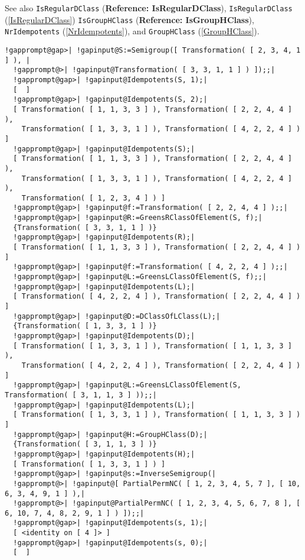 \documentclass[a4paper,11pt]{report}
\begin{document}
{{{ See also \texttt{IsRegularDClass} (\textbf{Reference: IsRegularDClass}), \texttt{IsRegularDClass} (\ref{IsRegularDClass}) \texttt{IsGroupHClass} (\textbf{Reference: IsGroupHClass}), \texttt{NrIdempotents} (\ref{NrIdempotents}), and \texttt{GroupHClass} (\ref{GroupHClass}). 
\begin{Verbatim}[commandchars=!@|,fontsize=\small,frame=single,label=Example]
  !gapprompt@gap>| !gapinput@S:=Semigroup([ Transformation( [ 2, 3, 4, 1 ] ), |
  !gapprompt@>| !gapinput@Transformation( [ 3, 3, 1, 1 ] ) ]);;|
  !gapprompt@gap>| !gapinput@Idempotents(S, 1);|
  [  ]
  !gapprompt@gap>| !gapinput@Idempotents(S, 2);|
  [ Transformation( [ 1, 1, 3, 3 ] ), Transformation( [ 2, 2, 4, 4 ] ), 
    Transformation( [ 1, 3, 3, 1 ] ), Transformation( [ 4, 2, 2, 4 ] ) ]
  !gapprompt@gap>| !gapinput@Idempotents(S);|
  [ Transformation( [ 1, 1, 3, 3 ] ), Transformation( [ 2, 2, 4, 4 ] ), 
    Transformation( [ 1, 3, 3, 1 ] ), Transformation( [ 4, 2, 2, 4 ] ), 
    Transformation( [ 1, 2, 3, 4 ] ) ]
  !gapprompt@gap>| !gapinput@f:=Transformation( [ 2, 2, 4, 4 ] );;|
  !gapprompt@gap>| !gapinput@R:=GreensRClassOfElement(S, f);|
  {Transformation( [ 3, 3, 1, 1 ] )}
  !gapprompt@gap>| !gapinput@Idempotents(R);|
  [ Transformation( [ 1, 1, 3, 3 ] ), Transformation( [ 2, 2, 4, 4 ] ) ]
  !gapprompt@gap>| !gapinput@f:=Transformation( [ 4, 2, 2, 4 ] );;|
  !gapprompt@gap>| !gapinput@L:=GreensLClassOfElement(S, f);;|
  !gapprompt@gap>| !gapinput@Idempotents(L);|
  [ Transformation( [ 4, 2, 2, 4 ] ), Transformation( [ 2, 2, 4, 4 ] ) ]
  !gapprompt@gap>| !gapinput@D:=DClassOfLClass(L);|
  {Transformation( [ 1, 3, 3, 1 ] )}
  !gapprompt@gap>| !gapinput@Idempotents(D);|
  [ Transformation( [ 1, 3, 3, 1 ] ), Transformation( [ 1, 1, 3, 3 ] ), 
    Transformation( [ 4, 2, 2, 4 ] ), Transformation( [ 2, 2, 4, 4 ] ) ]
  !gapprompt@gap>| !gapinput@L:=GreensLClassOfElement(S, Transformation( [ 3, 1, 1, 3 ] ));;|
  !gapprompt@gap>| !gapinput@Idempotents(L);|
  [ Transformation( [ 1, 3, 3, 1 ] ), Transformation( [ 1, 1, 3, 3 ] ) ]
  !gapprompt@gap>| !gapinput@H:=GroupHClass(D);|
  {Transformation( [ 3, 1, 1, 3 ] )}
  !gapprompt@gap>| !gapinput@Idempotents(H);|
  [ Transformation( [ 1, 3, 3, 1 ] ) ]
  !gapprompt@gap>| !gapinput@s:=InverseSemigroup(|
  !gapprompt@>| !gapinput@[ PartialPermNC( [ 1, 2, 3, 4, 5, 7 ], [ 10, 6, 3, 4, 9, 1 ] ),|
  !gapprompt@>| !gapinput@PartialPermNC( [ 1, 2, 3, 4, 5, 6, 7, 8 ], [ 6, 10, 7, 4, 8, 2, 9, 1 ] ) ]);;|
  !gapprompt@gap>| !gapinput@Idempotents(s, 1);|
  [ <identity on [ 4 ]> ]
  !gapprompt@gap>| !gapinput@Idempotents(s, 0);|
  [  ]
\end{Verbatim}
 }

}}
\end{document}

